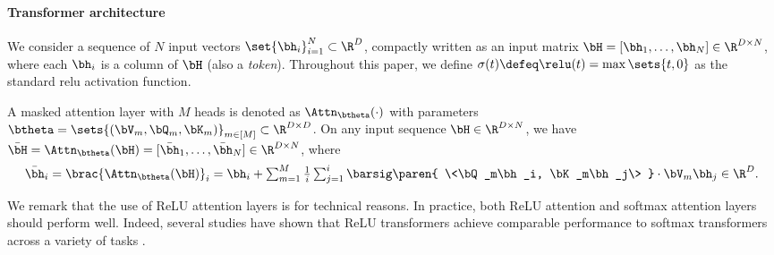 \documentclass[10pt]{article}
\begin{document}
\paragraph{Transformer architecture} We consider a sequence of $N$ input vectors $\set{\bh_i}_{i=1}^N\subset \R^D$, compactly written as an input matrix $\bH=[\bh_1,\dots,\bh_N]\in \R^{D\times N}$, where each $\bh_i$ is a column of $\bH$ (also a \emph{token}). Throughout this paper, we define $\sigma(t)\defeq \relu(t)=\max\sets{t,0}$ as the standard relu activation function. %



\begin{definition}
\label{def:masked-attention}
A masked attention layer with $M$ heads is denoted as $\Attn_{\btheta}(\cdot)$ with parameters $\btheta=\sets{ (\bV_m,\bQ_m,\bK_m)}_{m\in[M]}\subset \R^{D\times D}$. On any input sequence $\bH\in\R^{D\times N}$, we have $\bar{\bH} = \Attn_{\btheta}(\bH) = [\bar{\bh}_1, \ldots, \bar{\bh}_N] \in \R^{D \times N}$, where
\begin{align*}
\textstyle    \bar{\bh}_i = \brac{\Attn_{\btheta}(\bH)}_i = \bh_i + \sum_{m=1}^M \frac{1}{i}\sum_{j=1}^i \barsig\paren{ \<\bQ_m\bh_i, \bK_m\bh_j\> }\cdot \bV_m\bh_j \in \R^D.
\end{align*}
\end{definition}

We remark that the use of ReLU attention layers is for technical reasons. In practice, both ReLU attention and softmax attention layers should perform well. Indeed, several studies have shown that ReLU transformers achieve comparable performance to softmax transformers  across a variety of tasks \citep{wortsman2023replacing, shen2023study, bai2023transformers}.
\end{document}
